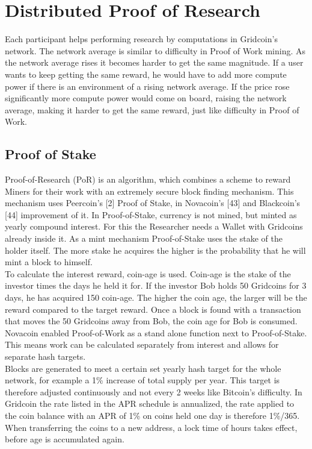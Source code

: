 \section{Distributed Proof of Research}

Each participant helps performing research by computations in Gridcoin's network. The network average is similar to difficulty in Proof of Work mining. As the network average rises it becomes harder to get the same magnitude. If a user wants to keep getting the same reward, he would have to add more compute power if there is an environment of a rising network average. If the price rose significantly more compute power would come on board, raising the network average, making it harder to get the same reward, just like difficulty in Proof of Work.

\subsection{Proof of Stake}

Proof-of-Research (PoR) is an algorithm, which combines a scheme to reward Miners for their work with an extremely secure block finding mechanism. This mechanism uses Peercoin's [2] Proof of Stake, in Novacoin's [43] and Blackcoin's [44] improvement of it. In Proof-of-Stake, currency is not mined, but minted as yearly compound interest. For this the Researcher needs a Wallet with Gridcoins already inside it. As a mint mechanism Proof-of-Stake uses the stake of the holder itself. The more stake he acquires the higher is the probability that he will mint a block to himself.\\

To calculate the interest reward, coin-age is used. Coin-age is the stake of the investor times the days he held it for. If the investor Bob holds 50 Gridcoins for 3 days, he has acquired 150 coin-age. The higher the coin age, the larger will be the reward compared to the target reward. Once a block is found with a transaction that moves the 50 Gridcoins away from Bob, the coin age for Bob is consumed.\\

Novacoin enabled Proof-of-Work as a stand alone function next to Proof-of-Stake. This means work can be calculated separately from interest and allows for separate hash targets.\\

Blocks are generated to meet a certain set yearly hash target for the whole network, for example a 1\% increase of total supply per year. This target is therefore adjusted continuously and not every 2 weeks like Bitcoin's difficulty. In Gridcoin the rate listed in the APR schedule is annualized, the rate applied to the coin balance with an APR of 1\% on coins held one day is therefore 1\%/365. When transferring the coins to a new address, a lock time of hours takes effect, before age is accumulated again.\\

